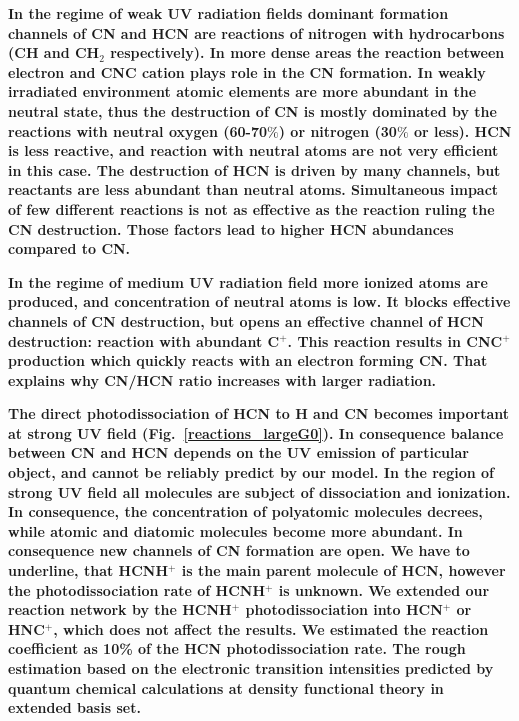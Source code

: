 \documentclass{aa}
\begin{document}
\textbf{In the regime of weak UV radiation fields dominant formation channels of CN and HCN are reactions of nitrogen with hydrocarbons
(CH and CH$_2$ respectively). In more dense areas the reaction between electron and CNC cation plays role in the CN formation. In weakly irradiated environment atomic elements are more abundant in the neutral state, thus the destruction of CN is mostly dominated by the
reactions with neutral oxygen (60-70$\%$) or nitrogen (30$\%$ or less). HCN is less reactive, and reaction with neutral atoms are not very efficient in this case. The destruction of HCN is driven by many channels, but reactants are less abundant than neutral atoms. Simultaneous impact of few different reactions is not as effective as the reaction ruling the CN destruction. Those factors lead to higher HCN abundances compared to CN.}


\textbf{In the regime of medium UV radiation field more ionized atoms are produced, and concentration of neutral atoms is low. It blocks effective channels of CN destruction, but opens an effective channel of HCN destruction: reaction with abundant C$^+$. This reaction
results in CNC$^+$ production which quickly reacts with an electron forming CN. That explains why CN/HCN ratio increases with larger radiation.}

\textbf{The direct photodissociation of HCN to H and CN becomes important at strong UV field (Fig.~\ref{reactions_largeG0}). In consequence balance between CN and HCN depends on the UV emission of particular object, and cannot be reliably predict by our model. In the region of strong UV field all molecules are subject of dissociation and ionization. In consequence, the concentration of polyatomic molecules decrees, while atomic and diatomic molecules become more abundant. In consequence new channels of CN formation are open. We have to underline, that HCNH$^+$ is the main parent molecule of HCN, however the photodissociation rate of HCNH$^+$ is unknown. We extended our reaction network by the HCNH$^+$ photodissociation into HCN$^+$ or HNC$^+$, which does not affect the results. We estimated the reaction coefficient as 10\% of the HCN photodissociation rate. The rough estimation based on the electronic transition intensities predicted by quantum chemical calculations at density functional theory in extended basis set. }


\end{document}
